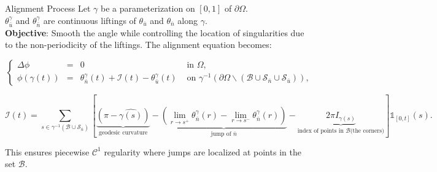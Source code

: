 \documentclass[compress,10pt,aspectratio=169]{beamer}
\begin{document}
\begin{frame}{Alignment Process}
\small
\vspace{-0.4cm}
Let \(\gamma\) be a parameterization on \([0, 1]\) of \(\partial\Omega\).\\\vspace{0.12cm}
\(\theta_{\bar{u}}^\gamma\) and \(\theta_{\bar{n}}^\gamma\) are continuous liftings of \(\theta_{\bar{u}}\) and \(\theta_{\bar{n}}\) along \(\gamma\).\\\vspace{0.12cm}
\textbf{Objective}: Smooth the angle while controlling the location of singularities due to the non-periodicity of the liftings. The alignment equation becomes:\\\vspace{0.12cm}

\begin{equation*}
\left\{
\begin{array}{lcll}
\Delta\phi &=& 0 &\mbox{ in } \Omega,\\[0.4cm]
\phi(\gamma(t)) &=& \theta_{\bar{n}}^\gamma(t) + \mathcal{I}(t) - \theta_{\bar{u}}^\gamma(t) & \mbox{ on } \gamma^{-1}(\partial\Omega \backslash (\mathcal{B} \cup \mathcal{S}_{\bar{n}} \cup \mathcal{S}_{\bar{u}})),
\end{array}
\right.
\end{equation*}

\begin{equation*}
\mathcal{I}(t) = \sum_{s \in \gamma^{-1}(\mathcal{B} \cup \mathcal{S}_{\bar{n}})} \left[\underbrace{\left(\pi - \widehat{\gamma(s)}\right)}_{\text{geodesic curvature}} - \underbrace{\left(\lim\limits_{r \rightarrow s^+}\theta^{\gamma}_{\bar{n}}(r) - \lim\limits_{r \rightarrow s^-}\theta^{\gamma}_{\bar{n}}(r)\right)}_{\text{jump of }\bar{n}} - \underbrace{2\pi I_{\gamma(s)}}_{\text{index of points in }\mathcal{B}\text{(the corners)}}\right] \mathbb{1}_{[0, t]}(s).
\end{equation*}

This ensures piecewise \(\mathcal{C}^1\) regularity where jumps are localized at points in the set \(\mathcal{B}\).

\end{frame}
\end{document}
